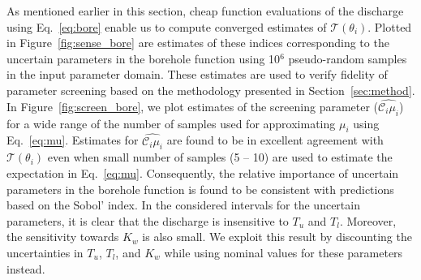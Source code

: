 As mentioned earlier in this section, cheap function evaluations of the discharge using 
Eq.~\ref{eq:bore} enable us to compute converged estimates of $\mathcal{T}(\theta_i)$. Plotted in
Figure~\ref{fig:sense_bore} are estimates of these indices corresponding to the uncertain
parameters in the borehole function using 10$^6$ pseudo-random
samples in the input parameter domain. These estimates are used to verify fidelity of
parameter screening based on the methodology presented in Section~\ref{sec:method}. 
In Figure~\ref{fig:screen_bore}, we plot estimates of the screening parameter ($\hat{\mathcal{C}_i\mu_i}$)
for a wide range of the number of samples used for approximating $\mu_i$ using Eq.~\ref{eq:mu}.
Estimates for $\hat{\mathcal{C}_i\mu_i}$ are found to be in excellent agreement with $\mathcal{T}(\theta_i)$
even when small number of samples (5 -- 10) are used to estimate the expectation in Eq.~\ref{eq:mu}. 
Consequently, the relative importance of uncertain 
parameters in the borehole function is found to be consistent with predictions based on the Sobol' index. 
In the considered intervals for the uncertain parameters, it is clear that the discharge is insensitive to
$T_u$ and $T_l$. Moreover, the sensitivity towards $K_w$ is also small. We exploit this result by 
discounting the uncertainties in $T_u$, $T_l$, and $K_w$ while using nominal values for these
parameters instead.  









































